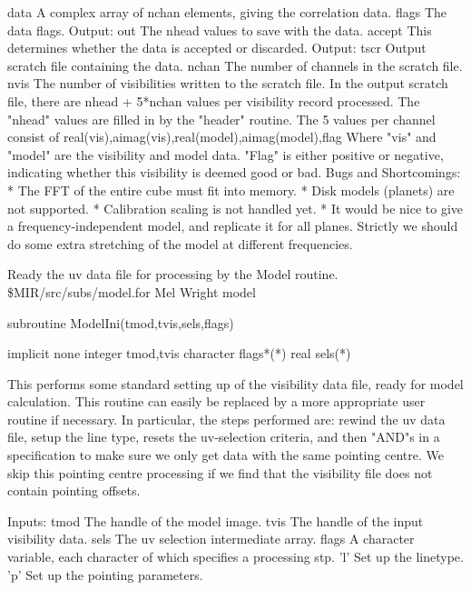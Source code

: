 {{                   data        A complex array of nchan elements, giving
                               the correlation data.
                   flags       The data flags.
                 Output:
                   out         The nhead values to save with the data.
                   accept      This determines whether the data is
                               accepted or discarded.
\endtt}
{\eightpoint\begintt
  Output:
    tscr       Output scratch file containing the data.
    nchan      The number of channels in the scratch file.
    nvis       The number of visibilities written to the scratch file.
\endtt}
{\eightpoint\begintt
  In the output scratch file, there are nhead + 5*nchan values per
  visibility record processed. The "nhead" values are filled in by
  the "header" routine. The 5 values per channel consist of
       real(vis),aimag(vis),real(model),aimag(model),flag
  Where "vis" and "model" are the visibility and model data. "Flag" is
  either positive or negative, indicating whether this visibility is
  deemed good or bad.
\endtt}
{\eightpoint\begintt
  Bugs and Shortcomings:
    * The FFT of the entire cube must fit into memory.
    * Disk models (planets) are not supported.
    * Calibration scaling is not handled yet.
    * It would be nice to give a frequency-independent model, and
      replicate it for all planes. Strictly we should do some extra
      stretching of the model at different frequencies.
\endtt}
\par}
%
\noindent Ready the uv data file for processing by the Model routine.
\newline \ 
\newline {} \$MIR/src/subs/model.for
\newline {} Mel Wright
\newline {} model
\par{\tenpoint
{\eightpoint\begintt
        subroutine ModelIni(tmod,tvis,sels,flags)

        implicit none
        integer tmod,tvis
        character flags*(*)
        real sels(*)

  This performs some standard setting up of the visibility data file,
  ready for model calculation. This routine can easily be replaced
  by a more appropriate user routine if necessary. In particular,
  the steps performed are: rewind the uv data file, setup the line
  type, resets the uv-selection criteria, and then "AND"s in a specification
  to make sure we only get data with the same pointing centre. We skip
  this pointing centre processing if we find that the visibility file
  does not contain pointing offsets.

  Inputs:
    tmod       The handle of the model image.
    tvis       The handle of the input visibility data.
    sels       The uv selection intermediate array.
    flags      A character variable, each character of which specifies
               a processing stp.
                'l'    Set up the linetype.
                'p'    Set up the pointing parameters.
\endtt}
\par}
